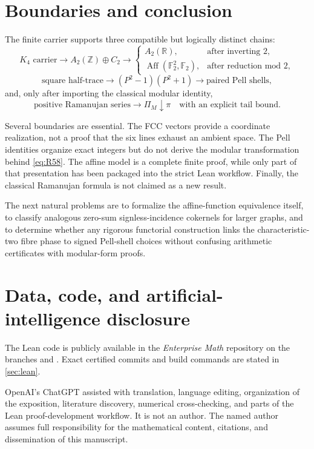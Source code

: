 \documentclass[11pt]{amsart}
\theoremstyle{definition}
\theoremstyle{remark}
\newcommand{\Z}{\mathbb Z}
\newcommand{\R}{\mathbb R}
\newcommand{\F}{\mathbb F}
\newcommand{\Aff}{\operatorname{Aff}}
\begin{document}
\section{Boundaries and conclusion}

The finite carrier supports three compatible but logically distinct chains:
\[
 K_4\text{ carrier}
 \longrightarrow A_2(\Z)\oplus C_2
 \longrightarrow
 \begin{cases}
 A_2(\R),&\text{after inverting }2,\\
 \Aff(\F_2^2,\F_2),&\text{after reduction mod }2,
 \end{cases}
\]
\[
 \text{square half-trace}
 \longrightarrow(P^2-1)(P^2+1)
 \longrightarrow\text{paired Pell shells},
\]
and, only after importing the classical modular identity,
\[
 \text{positive Ramanujan series}
 \longrightarrow\Pi_M\downarrow\pi
 \quad\text{with an explicit tail bound}.
\]

Several boundaries are essential. The FCC vectors provide a coordinate realization, not a proof that the six lines exhaust an ambient space. The Pell identities organize exact integers but do not derive the modular transformation behind \eqref{eq:R58}. The affine model is a complete finite proof, while only part of that presentation has been packaged into the strict Lean workflow. Finally, the classical Ramanujan formula is not claimed as a new result.

The next natural problems are to formalize the affine-function equivalence itself, to classify analogous zero-sum signless-incidence cokernels for larger graphs, and to determine whether any rigorous functorial construction links the characteristic-two fibre phase to signed Pell-shell choices without confusing arithmetic certificates with modular-form proofs.

\section*{Data, code, and artificial-intelligence disclosure}

The Lean code is publicly available in the \emph{Enterprise Math} repository on the branches
 and
. Exact certified commits and build commands are stated in \cref{sec:lean}.

OpenAI's ChatGPT assisted with translation, language editing, organization of the exposition, literature discovery, numerical cross-checking, and parts of the Lean proof-development workflow. It is not an author. The named author assumes full responsibility for the mathematical content, citations, and dissemination of this manuscript.
\end{document}
